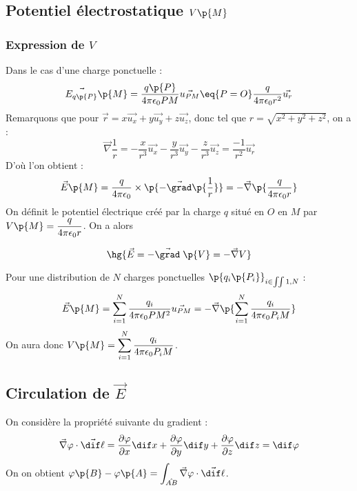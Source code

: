     \subsection{Potentiel électrostatique $V\p{M}$}
    
    \subsubsection{Expression de $V$}
    \begin{enumerate}
        \itt Dans le cas d'une charge ponctuelle :
        \[ \vec{E_{q\p{P}}}\p{M} = \dfrac{q\p{P}}{4\pi \epsilon_0 PM}\vec{u_{PM}} \eq{P = O} \dfrac{q}{4\pi \epsilon_0 r^2}\vec{u_r} \]
        Remarquons que pour $\vec r = x\vec{u_x} + y\vec{u_y} + z\vec{u_z}$, donc tel que $r = \sqrt{x^2 + y^2 + z^2}$, on a :
        \[ \vec \nabla \dfrac{1}{r} = -\dfrac{x}{r^3}\vec{u_x} - \dfrac{y}{r^3}\vec{u_y} - \dfrac{z}{r^3}\vec{u_z} = \dfrac{-1}{r^2}\vec{u_r}\]
        D'où l'on obtient :
        \[ \vec E\p{M} = \dfrac{q}{4\pi \epsilon_0}\times \p{-\vec{\grad}\p{\dfrac{1}{r}}} = -\vec{\nabla}\p{\dfrac{q}{4\pi\epsilon_0 r}} \]
        On définit le potentiel électrique créé par la charge $q$ situé en $O$ en $M$ par $V\p{M} = \dfrac{q}{4\pi\epsilon_0 r}$. On a alors 
        \begin{property}{}{}
            \[ \hg{\vec E = -\vec{\grad}\;\p{V} = - \vec\nabla V}\]
        \end{property}
        
        \itt Pour une distribution de $N$ charges ponctuelles $\p{q_i\p{P_i}}_{i \in \iint{1, N}}$ :
        \[ \vec E\p{M} = \sum_{i= 1}^N \dfrac{q_i}{4\pi \epsilon_0 PM^2}\vec{u_{PM}} = - \vec\nabla\p{\sum_{i=1}^N \dfrac{q_i}{4\pi \epsilon_0 P_iM}}\]
        On aura donc $V\p{M} = \displaystyle\sum_{i=1}^N \dfrac{q_i}{4\pi \epsilon_0 P_iM}$.
    \end{enumerate}

    \subsection{Circulation de $\vec E$}

    On considère la propriété suivante du gradient :
    \[ \vec\nabla \varphi \cdot \vec{\dif \ell} = \dfrac{\partial \varphi}{\partial x} \dif x + \dfrac{\partial \varphi}{\partial y}\dif y + \dfrac{\partial \varphi}{\partial z}\dif z = \dif \varphi\]
    On on obtient $\varphi\p{B} - \varphi\p{A} = \displaystyle\int_{\hat{AB}} \vec\nabla \varphi \cdot \vec{\dif \ell}$.
    
